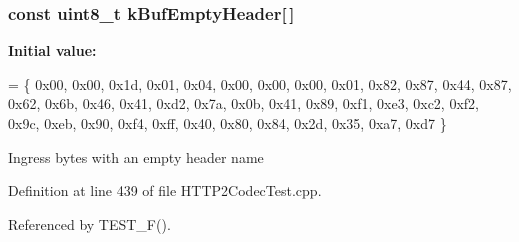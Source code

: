 \subsubsection[{k\+Buf\+Empty\+Header}]{\setlength{\rightskip}{0pt plus 5cm}const uint8\+\_\+t k\+Buf\+Empty\+Header[$\,$]}\label{HTTP2CodecTest_8cpp_a2b69648be053bedcf384853698c29d8e}
{\bfseries Initial value\+:}
\begin{DoxyCode}
= \{
  0x00, 0x00, 0x1d, 0x01, 0x04, 0x00, 0x00, 0x00, 0x01, 0x82,
  0x87, 0x44, 0x87, 0x62, 0x6b, 0x46, 0x41, 0xd2, 0x7a, 0x0b,
  0x41, 0x89, 0xf1, 0xe3, 0xc2, 0xf2, 0x9c, 0xeb, 0x90, 0xf4,
  0xff, 0x40, 0x80, 0x84, 0x2d, 0x35, 0xa7, 0xd7
\}
\end{DoxyCode}
Ingress bytes with an empty header name 

Definition at line 439 of file H\+T\+T\+P2\+Codec\+Test.\+cpp.



Referenced by T\+E\+S\+T\+\_\+\+F().

